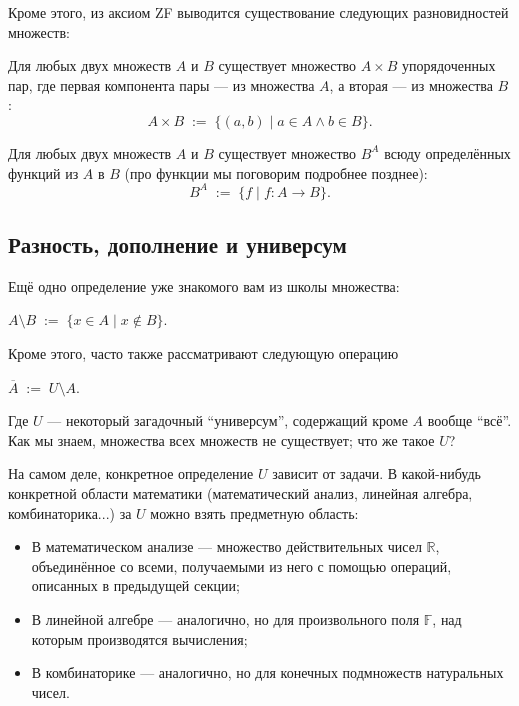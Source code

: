 Кроме этого, из аксиом ZF выводится существование следующих разновидностей
множеств:

\begin{defn}
  Для любых двух множеств $A$ и $B$ существует множество $A\times B$
  упорядоченных пар, где первая компонента пары --- из множества $A$, а вторая
  --- из множества $B$:
  \[
    A\times B\;:=\;\{(a, b)\;|\;a\in A\land b\in B\}.
  \]
\end{defn}
\begin{defn}
  Для любых двух множеств $A$ и $B$ существует множество $B^A$ всюду
  определённых функций из $A$ в $B$ (про функции мы поговорим подробнее
  позднее):
  \[
    B^A\;:=\;\{f\;|\;f:A\to B\}.
  \]
\end{defn}

\subsection{Разность, дополнение и универсум}

Ещё одно определение уже знакомого вам из школы множества:

\begin{defn}
  $A\setminus B\;:=\;\{x\in A\;|\;x\not\in B\}$.
\end{defn}

Кроме этого, часто также рассматривают следующую операцию

\begin{defn}
  $\overline{A}\;:=\;U\setminus A$.
\end{defn}

Где $U$ --- некоторый загадочный ``универсум'', содержащий кроме $A$ вообще
``всё''. Как мы знаем, множества всех множеств не существует; что же такое $U$?

На самом деле, конкретное определение $U$ зависит от задачи. В какой-нибудь
конкретной области математики (математический анализ, линейная алгебра,
комбинаторика...) за $U$ можно взять предметную область:

\begin{itemize}
  \item В математическом анализе --- множество действительных чисел
    $\mathbb{R}$, объединённое со всеми, получаемыми из него с помощью операций,
    описанных в предыдущей секции;
  \item В линейной алгебре --- аналогично, но для произвольного поля
    $\mathbb{F}$, над которым производятся вычисления;
  \item В комбинаторике --- аналогично, но для конечных подмножеств натуральных
    чисел.
\end{itemize}

